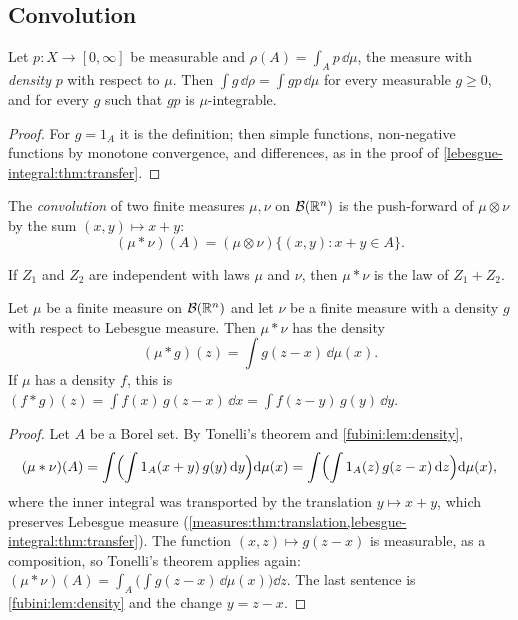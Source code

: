 \begin{notechapter}
\section{Convolution}\label{fubini:sec:convolution}

\begin{lemma}\label{fubini:lem:density}
Let $p:X\to[0, \infty]$ be measurable and
$\rho(A) = \int_Ap\,\dd\mu$, the measure with \emph{density} $p$ with
respect to $\mu$. Then $\int g\,\dd\rho = \int gp\,\dd\mu$ for every
measurable $g\geq0$, and for every $g$ such that $gp$ is
$\mu$-integrable.
\end{lemma}

\begin{proof}
For $g = 1_A$ it is the definition; then simple functions,
non-negative functions by monotone convergence, and differences, as in
the proof of \cref{lebesgue-integral:thm:transfer}.
\end{proof}

\begin{definition}[Convolution]\label{fubini:def:convolution}
The \emph{convolution} of two finite measures $\mu, \nu$ on
$\mathcal B(\mathbb{R}^n)$ is the push-forward of $\mu\otimes\nu$ by the sum
$(x, y)\mapsto x + y$:
\[
  (\mu*\nu)(A) = (\mu\otimes\nu)\bigl\{(x, y) : x + y\in A\bigr\} .
\]
\end{definition}

If $Z_1$ and $Z_2$ are independent with laws $\mu$ and $\nu$, then
$\mu*\nu$ is the law of $Z_1 + Z_2$.

\begin{theorem}\label{fubini:thm:convolution}
Let $\mu$ be a finite measure on $\mathcal B(\mathbb{R}^n)$ and let $\nu$ be a
finite measure with a density $g$ with respect to Lebesgue measure.
Then $\mu*\nu$ has the
density
\[
  (\mu*g)(z) = \int g(z - x)\,\dd\mu(x) .
\]
If $\mu$ has a density $f$, this is
$(f*g)(z) = \int f(x)\,g(z - x)\,\dd x = \int f(z - y)\,g(y)\,\dd y$.
\end{theorem}

\begin{proof}
Let $A$ be a Borel set. By Tonelli's theorem and
\cref{fubini:lem:density},
\[
  (\mu*\nu)(A) = \int\Bigl(\int1_A(x + y)\,g(y)\,\mathrm{d} y\Bigr)\mathrm{d}\mu(x)
  = \int\Bigl(\int1_A(z)\,g(z - x)\,\mathrm{d} z\Bigr)\mathrm{d}\mu(x) ,
\]
where the inner integral was transported by the translation
$y\mapsto x + y$, which preserves Lebesgue measure
(\cref{measures:thm:translation,lebesgue-integral:thm:transfer}). The
function $(x, z)\mapsto g(z - x)$ is measurable, as a composition, so
Tonelli's theorem applies again:
$(\mu*\nu)(A) = \int_A\bigl(\int g(z - x)\,\dd\mu(x)\bigr)\dd z$. The last
sentence is \cref{fubini:lem:density} and the change $y = z - x$.
\end{proof}


\end{notechapter}
